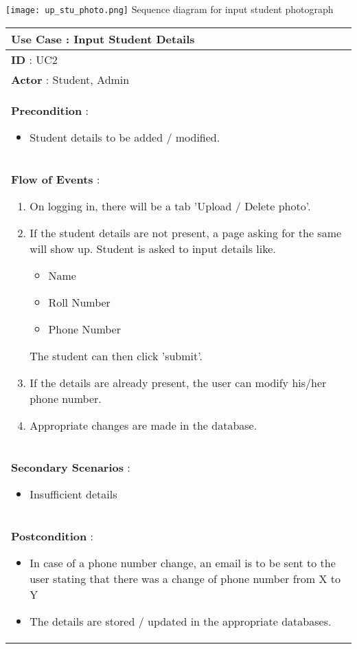 \documentclass[paper=a4, fontsize=15pt]{scrartcl}
\begin{document}
 

 
\begin{center}
\texttt{[image: up\_stu\_photo.png]}
{\Large Sequence diagram for input student photograph}
\end{center}

 
 
 
 
\begin{tabular}{|p{36em}|} 
 \hline
 \textbf{Use Case : Input Student Details}\\
 \hline
 \textbf{ID } : UC2\\
 \hline
 \textbf{Actor }: Student, Admin\\
 \hline
 \textbf{Precondition }:
 \begin{itemize}[topsep=0pt]
     \item Student details to be added / modified.
 \end{itemize}\\
 \hline
 \textbf{Flow of Events }:
 \begin{enumerate}[topsep=0pt]
     \item On logging in, there will be a tab 'Upload / Delete photo'.
     \item If the student details are not present, a page asking for the same will show up. Student is asked to input details like.
     \begin{itemize}[topsep=0pt]
         \item Name
         \item Roll Number
         \item Phone Number
     \end{itemize}
     The student can then click 'submit'.
     \item If the details are already present, the user can modify his/her phone number.
     \item Appropriate changes are made in the database.
 \end{enumerate}\\
 \hline
 \textbf{Secondary Scenarios }:
 \begin{itemize}[topsep=0pt]
     \item Insufficient details     
 \end{itemize}\\
 \hline 
 \textbf{Postcondition }:
 \begin{itemize}[topsep=0pt]
     \item In case of a phone number change, an email is to be sent to the user stating that there was a change of phone number from X to Y
     \item The details are stored / updated in the appropriate databases.
 \end{itemize}\\
 \hline
 
 
 \end{tabular}
 
\end{document}
